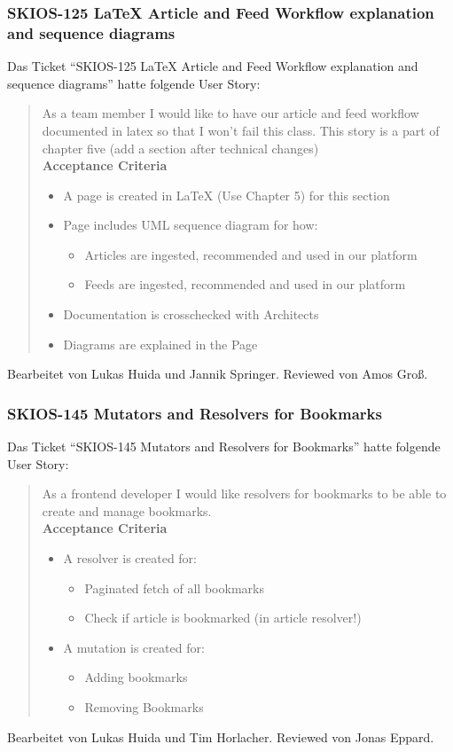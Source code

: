 \subsubsection{SKIOS-125 LaTeX Article and Feed Workflow explanation and sequence diagrams}
Das Ticket \enquote{SKIOS-125 LaTeX Article and Feed Workflow explanation and sequence diagrams} hatte folgende User Story:
\begin{quotation}
    As a team member I would like to have our article and feed workflow documented in latex so that I won't fail this class.
    This story is a part of chapter five (add a section after technical changes)\\
\textbf{Acceptance Criteria}
\begin{itemize}
    \item A page is created in LaTeX (Use Chapter 5) for this section
    \item Page includes UML sequence diagram for how:
    \begin{itemize}
        \item Articles are ingested, recommended and used in our platform
        \item Feeds are ingested, recommended and used in our platform
    \end{itemize}
    \item Documentation is crosschecked with Architects
    \item Diagrams are explained in the Page
\end{itemize}
\end{quotation}
Bearbeitet von Lukas Huida und Jannik Springer.
Reviewed von Amos Groß.

\subsubsection{SKIOS-145 Mutators and Resolvers for Bookmarks}
Das Ticket \enquote{SKIOS-145 Mutators and Resolvers for Bookmarks} hatte folgende User Story:
\begin{quotation}
    As a frontend developer I would like resolvers for bookmarks to be able to create and manage bookmarks. \\
\textbf{Acceptance Criteria}
\begin{itemize}
    \item A resolver is created for:
    \begin{itemize}
        \item Paginated fetch of all bookmarks
        \item Check if article is bookmarked (in article resolver!)
    \end{itemize}
    \item A mutation is created for:
    \begin{itemize}
        \item Adding bookmarks
        \item Removing Bookmarks
    \end{itemize}
\end{itemize}
\end{quotation}
Bearbeitet von Lukas Huida und Tim Horlacher.
Reviewed von Jonas Eppard.

